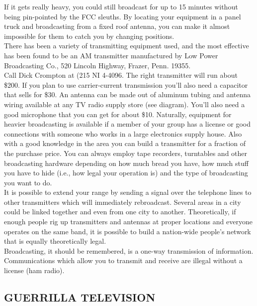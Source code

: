 \documentclass[11pt,twoside,a4paper]{book}
\begin{document}
If it gets really heavy, you could still broadcast for up to 15 minutes without being pin-pointed by the FCC sleuths. By locating your equipment in a panel truck and broadcasting from a fixed roof antenna, you can make it almost impossible for them to catch you by changing positions.~\\

There has been a variety of transmitting equipment used, and the most effective has been found to be an AM transmitter manufactured by Low Power Broadcasting Co., 520 Lincoln Highway, Frazer, Penn. 19355. ~\\

Call Dick Crompton at (215 NI 4-4096.  The right transmitter will run about \$200. If you plan to use carrier-current transmission you'll also need a capacitor that sells for \$30. An antenna can be made out of aluminum tubing and antenna wiring available at any TV radio supply store (see diagram). You'll also need a good microphone that you can get for about \$10. Naturally, equipment for heavier broadcasting is available if a member of your group has a license or good connections with someone who works in a large electronics supply house. Also with a good knowledge in the area you can build a transmitter for a fraction of the purchase price. You can always employ tape recorders, turntables and other broadcasting hardware depending on how much bread you have, how much stuff you have to hide (i.e., how legal your operation is) and the type of broadcasting you want to do.~\\

It is possible to extend your range by sending a signal over the telephone lines to other transmitters which will immediately rebroadcast. Several areas in a city could be linked together and even from one city to another. Theoretically, if enough people rig up transmitters and antennas at proper locations and everyone operates on the same band, it is possible to build a nation-wide people's network that is equally theoretically legal.~\\

Broadcasting, it should be remembered, is a one-way transmission of information. Communications which allow you to transmit and receive are illegal without a license (ham radio).~\\

\clearpage

\subsection{GUERRILLA TELEVISION}
\end{document}
